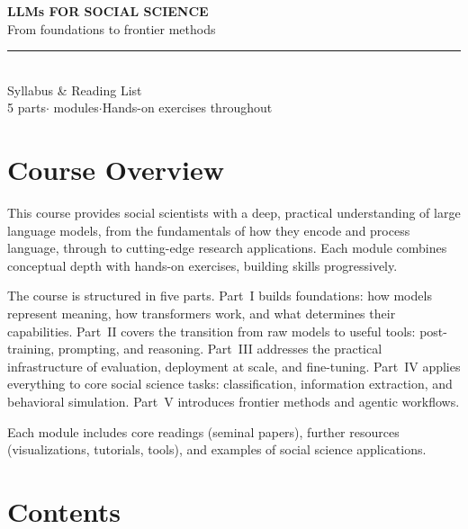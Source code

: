 \documentclass[11pt, a4paper]{article}
\begin{document}
\thispagestyle{empty}
\vspace*{4cm}
\begin{center}
  {\Huge\sffamily\bfseries\textcolor{dark}{LLMs FOR SOCIAL SCIENCE}}\\[0.6em]
  {\Large\sffamily\textcolor{accent}{From foundations to frontier methods}}\\[0.4em]
  \textcolor{bordercol}{\rule{0.6\textwidth}{1.5pt}}\\[0.6em]
  {\large\sffamily\textcolor{muted}{Syllabus \& Reading List}}\\[3em]
  {\textcolor{muted}{5 parts\;\;$\cdot$\; modules\;\;$\cdot$\;\;Hands-on exercises throughout}}
\end{center}
\vfill
\newpage

\section*{Course Overview}

This course provides social scientists with a deep, practical understanding of large language models, from the fundamentals of how they encode and process language, through to cutting-edge research applications. Each module combines conceptual depth with hands-on exercises, building skills progressively.

The course is structured in five parts. Part~I builds foundations: how models represent meaning, how transformers work, and what determines their capabilities. Part~II covers the transition from raw models to useful tools: post-training, prompting, and reasoning. Part~III addresses the practical infrastructure of evaluation, deployment at scale, and fine-tuning. Part~IV applies everything to core social science tasks: classification, information extraction, and behavioral simulation. Part~V introduces frontier methods and agentic workflows.

Each module includes core readings (seminal papers), further resources (visualizations, tutorials, tools), and examples of social science applications.

\newpage
\section*{Contents}
\vspace{0.5em}
\end{document}
